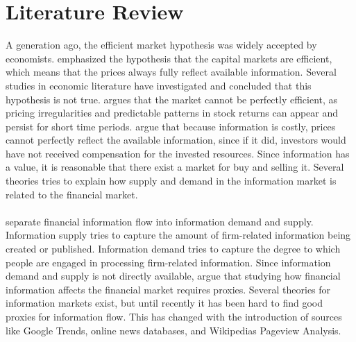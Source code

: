 
\chapter{Literature Review}
A generation ago, the efficient market hypothesis was widely accepted by economists. \cite{fama} emphasized the hypothesis that the capital markets are efficient, which means that the prices always fully reflect available information. Several studies in economic literature have investigated and concluded that this hypothesis is not true. \cite{malkiel} argues that the market cannot be perfectly efficient, as pricing irregularities and predictable patterns in stock returns can appear and persist for short time periods. \cite{grossman} argue that because information is costly, prices cannot perfectly reflect the available information, since if it did, investors would have not received compensation for the invested resources. Since information has a value, it is reasonable that there exist a market for buy and selling it. Several theories tries to explain how supply and demand in the information market is related to the financial market. 
\\\\
\cite{vlastakis} separate financial information flow into information demand and supply. Information supply tries to capture the amount of firm-related information being created or published. Information demand tries to capture the degree to which people are engaged in processing firm-related information. Since information demand and supply is not directly available, \cite{vlastakis} argue that studying how financial information affects the financial market requires proxies. Several theories for information markets exist, but until recently it has been hard to find good proxies for information flow. This has changed with the introduction of sources like Google Trends, online news databases, and Wikipedias Pageview Analysis.  
\\\\
